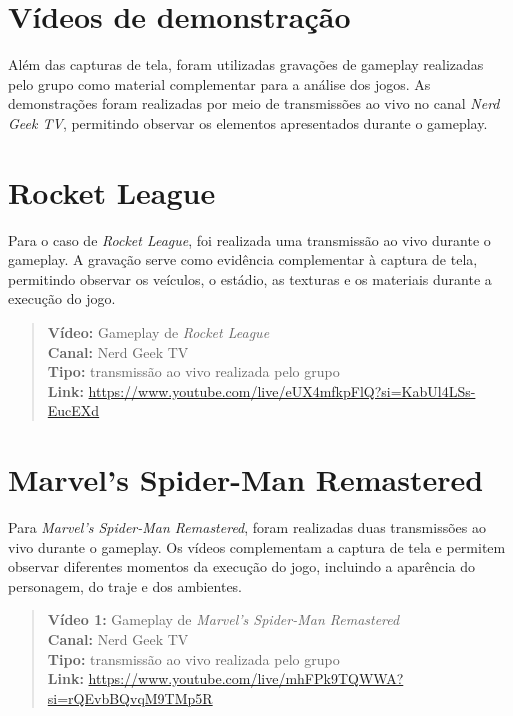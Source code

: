 \section{Vídeos de demonstração}

Além das capturas de tela, foram utilizadas gravações de gameplay realizadas
pelo grupo como material complementar para a análise dos jogos. As
demonstrações foram realizadas por meio de transmissões ao vivo no canal
\textit{Nerd Geek TV}, permitindo observar os elementos apresentados durante
o gameplay.

\section{Rocket League}

Para o caso de \textit{Rocket League}, foi realizada uma transmissão ao vivo
durante o gameplay. A gravação serve como evidência complementar à captura de
tela, permitindo observar os veículos, o estádio, as texturas e os materiais
durante a execução do jogo.

\begin{quote}
\textbf{Vídeo:} Gameplay de \textit{Rocket League}\\
\textbf{Canal:} Nerd Geek TV\\
\textbf{Tipo:} transmissão ao vivo realizada pelo grupo\\
\textbf{Link:} \url{https://www.youtube.com/live/eUX4mfkpFlQ?si=KabUl4LSs-EucEXd}
\end{quote}

\section{Marvel's Spider-Man Remastered}

Para \textit{Marvel's Spider-Man Remastered}, foram realizadas duas
transmissões ao vivo durante o gameplay. Os vídeos complementam a captura de
tela e permitem observar diferentes momentos da execução do jogo, incluindo a
aparência do personagem, do traje e dos ambientes.

\begin{quote}
\textbf{Vídeo 1:} Gameplay de \textit{Marvel's Spider-Man Remastered}\\
\textbf{Canal:} Nerd Geek TV\\
\textbf{Tipo:} transmissão ao vivo realizada pelo grupo\\
\textbf{Link:} \url{https://www.youtube.com/live/mhFPk9TQWWA?si=rQEvbBQvqM9TMp5R}
\end{quote}

